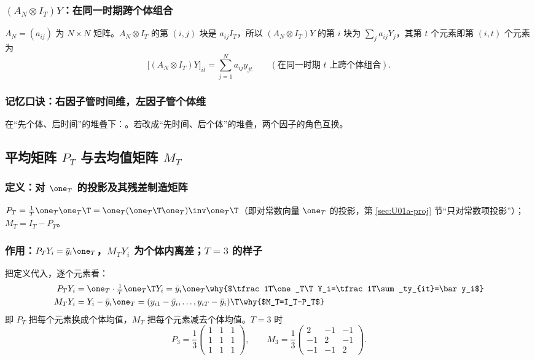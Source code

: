\subsubsection{\texorpdfstring{$(A_N\otimes I_T)Y$}{(A\_N x I)Y}：在同一时期跨个体组合}

$A_N=(a_{ij})$ 为 $N\times N$ 矩阵。$A_N\otimes I_T$ 的第 $(i,j)$ 块是 $a_{ij}I_T$，所以 $(A_N\otimes I_T)Y$ 的第 $i$ 块为 $\sum_ja_{ij}Y_j$，其第 $t$ 个元素即第 $(i,t)$ 个元素为
\[
\big[(A_N\otimes I_T)Y\big]_{it}=\sum_{j=1}^N a_{ij}y_{jt}\qquad(\text{在同一时期 } t \text{ 上跨个体组合}).
\]

\subsubsection{记忆口诀：右因子管时间维，左因子管个体维}

在“先个体、后时间”的堆叠下：。若改成“先时间、后个体”的堆叠，两个因子的角色互换。

\subsection{平均矩阵 \texorpdfstring{$P_T$}{P\_T} 与去均值矩阵 \texorpdfstring{$M_T$}{M\_T}}

\subsubsection{定义：对 \texorpdfstring{$\one_T$}{1\_T} 的投影及其残差制造矩阵}

\begin{defn}[平均矩阵与去均值矩阵]\label{def:U01a-PTMT}
 $P_T=\frac1T\one_T\one_T\T=\one_T(\one_T\T\one_T)\inv\one_T\T$（即对常数向量 $\one_T$ 的投影，第 \ref{sec:U01a-proj} 节“只对常数项投影”）； $M_T=I_T-P_T$。
\end{defn}

\subsubsection{作用：\texorpdfstring{$P_TY_i=\bar y_i\one_T$，$M_TY_i$}{P\_T Y\_i = y-bar\_i 1, M\_T Y\_i} 为个体内离差；\texorpdfstring{$T=3$}{T=3} 的样子}

把定义代入，逐个元素看：
\begin{align*}
P_TY_i &= \one_T\cdot\tfrac1T\one_T\T Y_i=\bar y_i\one_T \why{$\tfrac1T\one_T\T Y_i=\tfrac1T\sum_ty_{it}=\bar y_i$}\\
M_TY_i &= Y_i-\bar y_i\one_T=(y_{i1}-\bar y_i,\dots,y_{iT}-\bar y_i)\T \why{$M_T=I_T-P_T$}
\end{align*}
即 $P_T$ 把每个元素换成个体均值，$M_T$ 把每个元素减去个体均值。$T=3$ 时
\[
P_3=\frac13\begin{pmatrix}1&1&1\\1&1&1\\1&1&1\end{pmatrix},\qquad
M_3=\frac13\begin{pmatrix}2&-1&-1\\-1&2&-1\\-1&-1&2\end{pmatrix}.
\]

